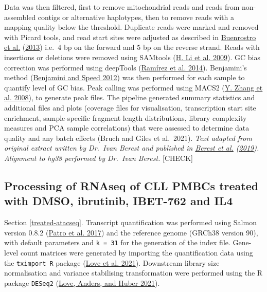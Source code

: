\documentclass[11pt, a4paper, twosided]{book}
\begin{document}
Data was then filtered, first to remove mitochondrial reads and reads from non-assembled contigs or alternative haplotypes, then to remove reads with a mapping quality below the threshold. Duplicate reads were marked and removed with Picard tools, and read start sites were adjusted as described in \protect\hyperlink{ref-Buenrostro2013}{Buenrostro et al.} (\protect\hyperlink{ref-Buenrostro2013}{2013}) i.e.~4 bp on the forward and 5 bp on the reverse strand. Reads with insertions or deletions were removed using SAMtools (\protect\hyperlink{ref-Samtools}{H. Li et al. 2009}).
GC bias correction was performed using deepTools (\protect\hyperlink{ref-deepTools}{Ramírez et al. 2014}). Benjamini's method (\protect\hyperlink{ref-Benjamini2012}{Benjamini and Speed 2012}) was then performed for each sample to quantify level of GC bias. Peak calling was performed using MACS2 (\protect\hyperlink{ref-MACS2}{Y. Zhang et al. 2008}), to generate peak files. The pipeline generated summary statistics and additional files and plots (coverage files for visualisation, transcription start site enrichment, sample-specific fragment length distributions, library complexity measures and PCA sample correlations) that were assessed to determine data quality and any batch effects (Bruch and Giles et al.~2021). \emph{Text adapted from original extract written by Dr.~Ivan Berest and published in \protect\hyperlink{ref-Berest2019}{Berest et al.} (\protect\hyperlink{ref-Berest2019}{2019}). Alignment to hg38 performed by Dr.~Ivan Berest.} {[}CHECK{]}

\hypertarget{processing-of-rnaseq-of-cll-pmbcs-treated-with-dmso-ibrutinib-ibet-762-and-il4}{%
\subsection{Processing of RNAseq of CLL PMBCs treated with DMSO, ibrutinib, IBET-762 and IL4}\label{processing-of-rnaseq-of-cll-pmbcs-treated-with-dmso-ibrutinib-ibet-762-and-il4}}

Section \ref{treated-atacseq}. Transcript quantification was performed using Salmon version 0.8.2 (\protect\hyperlink{ref-Salmon}{Patro et al. 2017}) and the reference genome (GRCh38 version 90), with default parameters and \texttt{k\ =\ 31} for the generation of the index file. Gene-level count matrices were generated by importing the quantification data using the \texttt{tximport\ R} package (\protect\hyperlink{ref-R-tximport}{Love et al. 2021}). Downstream library size normalisation and variance stabilising transformation were performed using the R package \texttt{DESeq2} (\protect\hyperlink{ref-R-DESeq2}{Love, Anders, and Huber 2021}).
\end{document}

